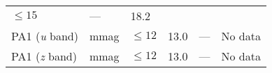 \documentclass[DM,toc]{lsstdoc}
\begin{document}
\begin{longtable}[]{@{}llllll@{}}
\begin{minipage}[t]{0.17\columnwidth}
\(\leq 15\)\strut
\end{minipage} & \begin{minipage}[t]{0.17\columnwidth}\raggedright\strut
---\strut
\end{minipage} & \begin{minipage}[t]{0.12\columnwidth}\raggedright\strut
18.2\strut
\end{minipage} & \begin{minipage}[t]{0.17\columnwidth}\raggedright\strut
\strut
\end{minipage}\tabularnewline
\begin{minipage}[t]{0.14\columnwidth}\raggedright\strut
PA1 (\emph{u} band)\strut
\end{minipage} & \begin{minipage}[t]{0.06\columnwidth}\raggedright\strut
mmag\strut
\end{minipage} & \begin{minipage}[t]{0.17\columnwidth}\raggedright\strut
\(\leq 12\)\strut
\end{minipage} & \begin{minipage}[t]{0.17\columnwidth}\raggedright\strut
13.0\strut
\end{minipage} & \begin{minipage}[t]{0.12\columnwidth}\raggedright\strut
---\strut
\end{minipage} & \begin{minipage}[t]{0.17\columnwidth}\raggedright\strut
No data\strut
\end{minipage}\tabularnewline
\begin{minipage}[t]{0.14\columnwidth}\raggedright\strut
PA1 (\emph{z} band)\strut
\end{minipage} & \begin{minipage}[t]{0.06\columnwidth}\raggedright\strut
mmag\strut
\end{minipage} & \begin{minipage}[t]{0.17\columnwidth}\raggedright\strut
\(\leq 12\)\strut
\end{minipage} & \begin{minipage}[t]{0.17\columnwidth}\raggedright\strut
13.0\strut
\end{minipage} & \begin{minipage}[t]{0.12\columnwidth}\raggedright\strut
---\strut
\end{minipage} & \begin{minipage}[t]{0.17\columnwidth}\raggedright\strut
No data\strut
\end{minipage}\tabularnewline

\end{longtable}
\end{document}
